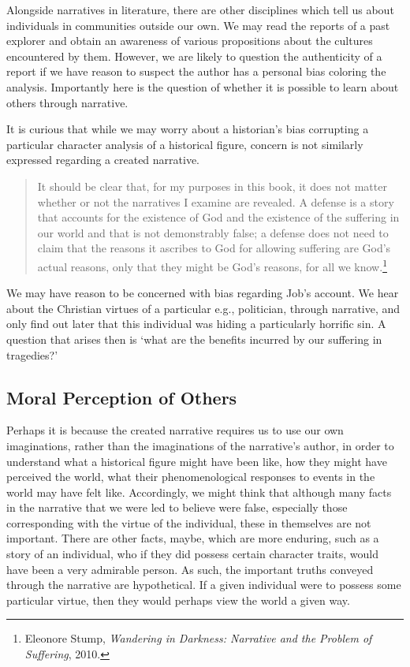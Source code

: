 \documentclass[phdthesis,12pt,final]{wuthesis}
\theoremstyle{definition}
\theoremstyle{definition}
\theoremstyle{definition}
\theoremstyle{definition}
\theoremstyle{remark}
\begin{document}
Alongside narratives in literature, there are other disciplines which tell us about individuals in communities outside our own. We may read the reports of a past explorer and obtain an awareness of various propositions about the cultures encountered by them. However, we are likely to question the authenticity of a report if we have reason to suspect the author has a personal bias coloring the analysis. Importantly here is the question of whether it is possible to learn about others through narrative.

It is curious that while we may worry about a historian's bias corrupting a particular character analysis of a historical figure, concern is not similarly expressed regarding a created narrative.

\begin{quote}
It should be clear that, for my purposes in this book, it does not matter whether or not the narratives I examine are revealed. A defense is a story that accounts for the existence of God and the existence of the suffering in our world and that is not demonstrably false; a defense does not need to claim that the reasons it ascribes to God for allowing suffering are God's actual reasons, only that they might be God's reasons, for all we know.\footnote{Eleonore Stump, \emph{Wandering in {Darkness}: {Narrative} and the {Problem} of {Suffering}}, 2010.}
\end{quote}

We may have reason to be concerned with bias regarding Job's account. We hear about the Christian virtues of a particular e.g., politician, through narrative, and only find out later that this individual was hiding a particularly horrific sin. A question that arises then is `what are the benefits incurred by our suffering in tragedies?'

\subsection*{Moral Perception of Others}\label{moral-perception-of-others}

Perhaps it is because the created narrative requires us to use our own imaginations, rather than the imaginations of the narrative's author, in order to understand what a historical figure might have been like, how they might have perceived the world, what their phenomenological responses to events in the world may have felt like. Accordingly, we might think that although many facts in the narrative that we were led to believe were false, especially those corresponding with the virtue of the individual, these in themselves are not important. There are other facts, maybe, which are more enduring, such as a story of an individual, who if they did possess certain character traits, would have been a very admirable person. As such, the important truths conveyed through the narrative are hypothetical. If a given individual were to possess some particular virtue, then they would perhaps view the world a given way.
\end{document}
